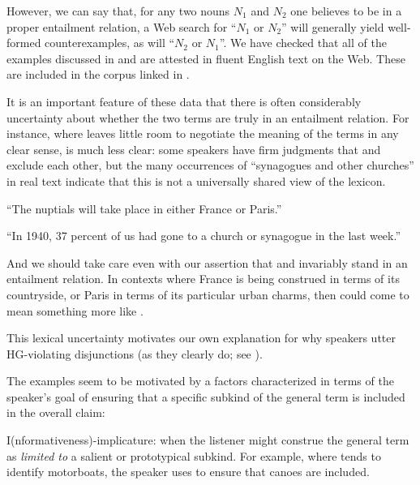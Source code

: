 \documentclass{article}
\begin{document}
\begin{examples}
\item However, we can say that, for any two nouns $N_{1}$ and $N_{2}$
  one believes to be in a proper entailment relation, a Web search for
  ``$N_{1}$ or $N_{2}$'' will generally yield well-formed
  counterexamples, as will ``$N_{2}$ or $N_{1}$''. We have checked
  that all of the examples discussed in \citealt{Hurford:1974} and
  \citealt{Singh:2008} are attested in fluent English text on the
  Web. These are included in the corpus linked in .

\item It is an important feature of these data that there is often
  considerably uncertainty about whether the two terms are truly in an
  entailment relation. For instance, where  leaves
  little room to negotiate the meaning of the terms in any clear
  sense,  is much less clear: some speakers have
  firm judgments that  and  exclude each
  other, but the many occurrences of ``synagogues and other churches''
  in real text indicate that this is not a universally shared view of
  the lexicon.

  \begin{examples}
  \item\label{franceorparis} ``The nuptials will take place in either
    France or Paris.''
  \item\label{churchorsynagogue} ``In 1940, 37 percent of us had gone
    to a church or synagogue in the last week.''
  \end{examples}

\item And we should take care even with our assertion that
   and  invariably stand in an entailment
  relation. In contexts where France is being construed in terms of
  its countryside, or Paris in terms of its particular urban charms,
  then  could come to mean something more like
  .

\item This lexical uncertainty motivates our own explanation for why
  speakers utter HG-violating disjunctions (as they clearly do; see
  ).

\item The examples seem to be motivated by a factors characterized in
  terms of the speaker's goal of ensuring that a specific subkind of
  the general term is included in the overall claim:

  \begin{examples}
  \item I(nformativeness)-implicature: when the listener might
    construe the general term as \emph{limited to} a salient or
    prototypical subkind. For example, where  tends to
    identify motorboats, the speaker uses  to
    ensure that canoes are included.
    

\end{examples}
\end{examples}
\end{document}

